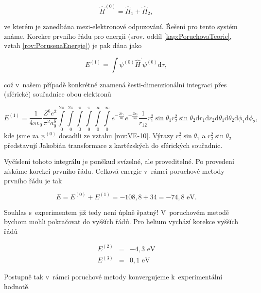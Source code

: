 \begin{equation}
\hat{H}^{(0)} = \hat{H}_1 + \hat{H}_2,
\label{rov:VE-12}
\end{equation}

\noindent ve kterém je zanedbána mezi-elektronové odpuzování. Řešení pro tento systém známe. Korekce prvního řádu pro energii (srov. oddíl \ref{kap:PoruchovaTeorie}, vztah \eqref{rov:PorusenaEnergie}) je pak dána jako

\begin{equation}
E^{(1)} = \int \psi^{(0)} \hat{H}^{\prime} \psi^{(0)} \mathrm{d}\tau,
\label{rov:VE-13}
\end{equation}

\noindent což v~našem případě konkrétně znamená šesti-dimenzionální integraci přes (sférické) souřadnice obou elektronů 

\begin{equation}
E^{(1)} = \frac{1}{4 \pi \epsilon_0} \frac{Z^6 e^2}{\pi^2 a_0^6} \int \limits_0^{2 \pi} \int \limits_0^{2 \pi} \int \limits_0^{\pi} \int \limits_0^{\pi} \int \limits_0^{\infty} \int \limits_0^{\infty} e^{-\frac{Z r_1}{a_0}} e^{-\frac{Z r_2}{a_0}} \frac{1}{r_{12}} r_1^2 \sin \theta_1 r_2^2 \sin \theta_2 \mathrm{d}r_1 \mathrm{d}r_2 \mathrm{d} \theta_1 \mathrm{d}\theta_2 \mathrm{d}\phi_1 \mathrm{d}\phi_2,
\label{rov:VE-14}
\end{equation}
kde jsme za $\psi^{(0)}$ dosadili ze vztahu \eqref{rov:VE-10}. Výrazy $r_1^2 \sin \theta_1$ a $r_2^2 \sin \theta_2$ představují Jakobián transformace z kartézských do sférických souřadnic.

Vyčíslení tohoto integrálu je poněkud svízelné, ale proveditelné. Po provedení získáme korekci prvního řádu. Celková energie v~rámci poruchové metody prvního řádu je tak 

\begin{equation}
E= E^{(0)} + E^{(1)} = -108{,}8 + 34=-74{,}8 \mbox{ eV}.
\label{rov:VE-15}
\end{equation}

Souhlas s~experimentem již tedy není úplně špatný! V~poruchovém metodě bychom mohli pokračovat do vyšších řádů. Pro helium vychází korekce vyšších řádů

\begin{eqnarray*}
E^{(2)} &=& -4{,}3 \mbox{ eV}\\
E^{(3)} &=& 0{,}1 \mbox{ eV}
\end{eqnarray*}

Postupně tak v~rámci poruchové metody konvergujeme k~experimentální hodnotě.

